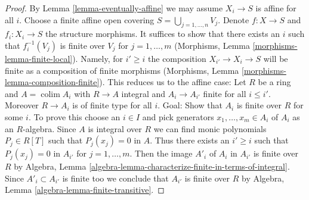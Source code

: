 \documentclass[10pt,a4paper]{amsart}
\theoremstyle{plain}
\theoremstyle{definition}
\theoremstyle{remark}
\numberwithin{equation}{subsection}
\def\colim{\mathop{\mathrm{colim}}\nolimits}
\begin{document}
\begin{proof}
By Lemma \ref{lemma-eventually-affine}
we may assume $X_i \to S$ is affine for all $i$.
Choose a finite affine open covering $S = \bigcup_{j = 1, \ldots, n} V_j$.
Denote $f : X \to S$ and $f_i : X_i \to S$ the structure morphisms.
It suffices to show that there exists an $i$ such that
$f_i^{-1}(V_j)$ is finite over $V_j$ for $j = 1, \ldots, m$
(Morphisms, Lemma \ref{morphisms-lemma-finite-local}).
Namely, for $i' \geq i$ the composition $X_{i'} \to X_i \to S$
will be finite as a composition of finite morphisms
(Morphisms, Lemma \ref{morphisms-lemma-composition-finite}).
This reduces us to the affine case: Let $R$ be a ring and
$A = \colim A_i$ with $R \to A$ integral and $A_i \to A_{i'}$
finite for all $i \leq i'$. Moreover $R \to A_i$ is of finite type
for all $i$. Goal: Show that $A_i$ is finite over $R$ for some $i$.
To prove this choose an $i \in I$ and pick generators
$x_1, \ldots, x_m \in A_i$ of $A_i$ as an $R$-algebra.
Since $A$ is integral over $R$ we can find monic polynomials
$P_j \in R[T]$ such that $P_j(x_j) = 0$ in $A$.
Thus there exists an $i' \geq i$ such that $P_j(x_j) = 0$ in $A_{i'}$
for $j = 1, \ldots, m$. Then the image $A'_i$ of $A_i$ in $A_{i'}$
is finite over $R$ by
Algebra, Lemma \ref{algebra-lemma-characterize-finite-in-terms-of-integral}.
Since $A'_i \subset A_{i'}$ is finite too we conclude
that $A_{i'}$ is finite over $R$ by
Algebra, Lemma \ref{algebra-lemma-finite-transitive}.
\end{proof}
\end{document}
